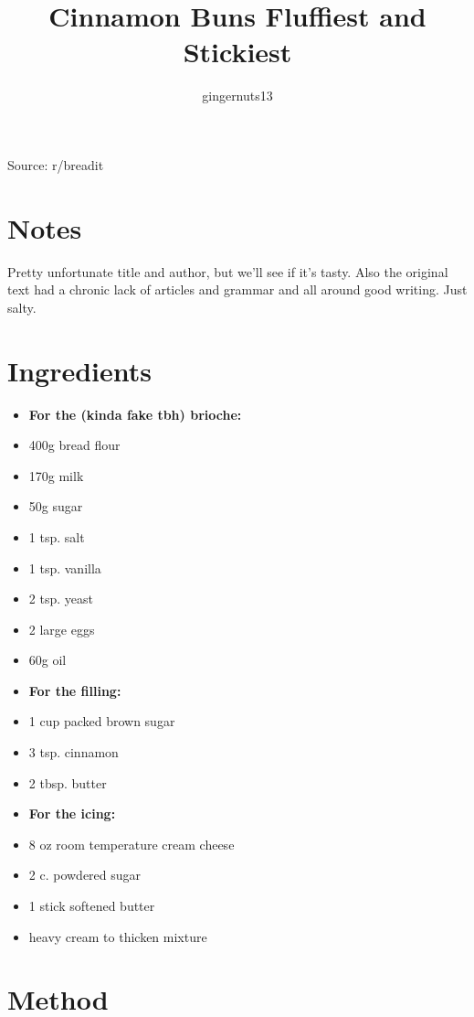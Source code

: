 \documentclass[12pt]{article}
\author{gingernuts13}
\title{Cinnamon Buns Fluffiest and Stickiest}
\date{}
\begin{document}
\begin{multicols*}{2}
\maketitle

Source: r/breadit

\section{Notes}

Pretty unfortunate title and author, but we'll see if it's tasty. Also the original text had a chronic lack of articles and grammar and all around good writing. Just salty.

\section{Ingredients}

\begin{itemize}
    \item \textbf{For the (kinda fake tbh) brioche:}
    \item 400g bread flour
    \item 170g milk
    \item 50g sugar
    \item 1 tsp. salt
    \item 1 tsp. vanilla
    \item 2 tsp. yeast
    \item 2 large eggs
    \item 60g oil
    \item \textbf{For the filling:}
    \item 1 cup packed brown sugar
    \item 3 tsp. cinnamon
    \item 2 tbsp. butter
    \item \textbf{For the icing:}
    \item 8 oz room temperature cream cheese
    \item 2 c. powdered sugar
    \item 1 stick softened butter
    \item heavy cream to thicken mixture
\end{itemize}

\section{Method}


\end{multicols*}
\end{document}
